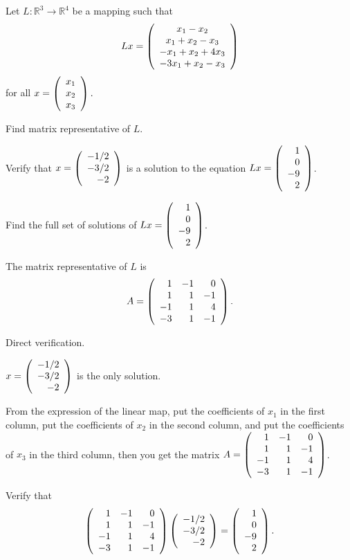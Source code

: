 \documentclass{ximera}
\begin{document}
\begin{exercise} \label{YZ_3.4.6}
Let $L:\mathbb R^3\to \mathbb R^4$ be a mapping such that 
\[
Lx=\left(\begin{array}{cccccccccccc} x_1-x_2 \\ x_1+x_2-x_3\\ -x_1+x_2+4x_3 \\ -3x_1+x_2-x_3 \end{array}\right)
\]
for all $x=\left(\begin{array}{rrrrrrrrrrrrrrrrrr} x_1 \\ x_2 \\ x_3 \end{array}\right).$
\begin{enumeratea}
\item Find matrix representative of $L$.
\item Verify that $x=\left(\begin{array}{rrrrrrrrrrrrrrrrrr} -1/2\\-3/2\\-2 \end{array}\right)$ is a solution to the equation $Lx=\left(\begin{array}{rrrrrrrrrrrrrrrrrr} 1 \\ 0 \\ -9\\2  \end{array}\right)$.
\item Find the full set of solutions of $Lx=\left(\begin{array}{rrrrrrrrrrrrrrrrrr} 1 \\ 0 \\ -9\\2  \end{array}\right)$.
\end{enumeratea}


\begin{solution}
\ans
 \begin{enumeratea}
\item  The matrix representative of $L$ is 
\[
A=\left(\begin{array}{rrrrrrrrrrrrrrrrrr} 1 &-1& 0\\ 1&1&-1\\ -1&1&4 \\ -3&1&-1 \end{array}\right).
\]
\item Direct verification.
\item $x=\left(\begin{array}{rrrrrrrrrrrrrrrrrr} -1/2\\-3/2\\-2 \end{array}\right)$ is the only solution.
\end{enumeratea}


\soln 
\begin{enumeratea}
\item From the expression of the linear map, put the coefficients of $x_1$ in the first column, put the coefficients of $x_2$ in the second column, and put the coefficients of $x_3$ in the third column, then you get the matrix $A=\left(\begin{array}{rrrrrrrrrrrrrrrrrr} 1 &-1& 0\\ 1&1&-1\\ -1&1&4 \\ -3&1&-1 \end{array}\right)$.
\item Verify that 
\[
\left(\begin{array}{rrrrrrrrrrrrrrrrrr} 1 &-1& 0\\ 1&1&-1\\ -1&1&4 \\ -3&1&-1 \end{array}\right)\left(\begin{array}{rrrrrrrrrrrrrrrrrr} -1/2\\-3/2\\-2 \end{array}\right)=\left(\begin{array}{rrrrrrrrrrrrrrrrrr} 1 \\ 0 \\ -9\\2  \end{array}\right).
\]


\end{enumeratea}
\end{solution}
\end{exercise}
\end{document}
